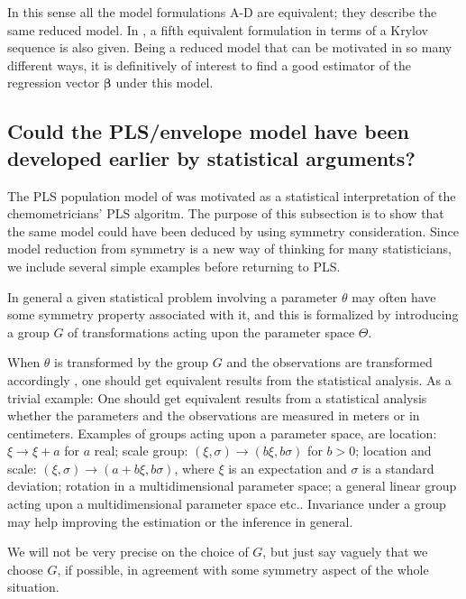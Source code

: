 \documentclass[a4paper, 11pt]{article}
\begin{document}
\bigskip

In this sense all the model formulations A-D are equivalent; they describe the same reduced model. In \citet{cook2013envelopes}, a fifth equivalent formulation in terms 
of a Krylov sequence is also given. Being a reduced model that can be motivated in so many different ways, it is definitively of interest to find a good estimator of the regression vector $\bm{\beta}$ under this model.

\bigskip

\subsection{Could the PLS/envelope model have been developed earlier by statistical arguments?}

The PLS population model of \citet{helland1990partial} was motivated as a statistical interpretation of the chemometricians' PLS algoritm. The purpose of this subsection is to show that the same model could have been deduced by using symmetry consideration. Since model reduction from symmetry is a new way of thinking for many statisticians, we include several simple examples before returning to PLS.

In general a given statistical problem involving a parameter $\theta$ may often have some 
symmetry property associated with it, and this is formalized by introducing a group $G$ of transformations acting upon the parameter space $\Theta$. 

When $\theta$ is transformed by the group $G$ and the observations are transformed accordingly \citep[see][]{helland2004statistical}, one should get equivalent results from the statistical analysis. As a trivial example: One should get equivalent results from a statistical analysis whether the parameters and the observations are measured in meters or in centimeters. Examples of groups acting upon a parameter space, are location: $\xi\rightarrow \xi+a$ for $a$ real; scale group: $(\xi ,\sigma)\rightarrow (b\xi , b\sigma)$ for $b>0$; location and scale: $(\xi,\sigma)\rightarrow(a+b\xi, b\sigma)$, where $\xi$ is an expectation and $\sigma$ is a standard deviation; rotation in a multidimensional parameter space; a general linear group acting upon a multidimensional parameter space etc.. Invariance under a group may help improving the estimation or the inference in general.


We will not be very precise on the choice of $G$, but just say vaguely that we choose $G$, if possible, in agreement with some symmetry aspect of the whole situation.
\end{document}
